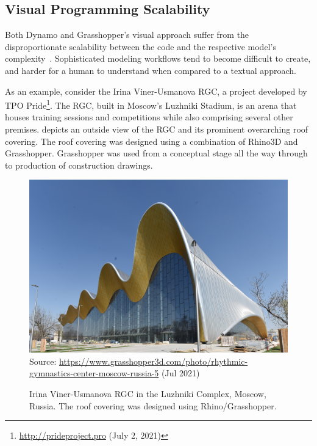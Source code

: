 \subsection{Visual Programming Scalability}%
\label{sec:related.ad.vpl-scalability}

Both Dynamo and Grasshopper's visual approach suffer from the disproportionate
scalability between the code and the respective model's
complexity~\cite{Leitao:2013:PESLGD}.  Sophisticated modeling workflows tend to
become difficult to create, and harder for a human to understand when compared
to a textual approach.

As an example, consider the Irina Viner-Usmanova \ac{RGC}, a project developed
by TPO Pride\footnote{\url{http://prideproject.pro} (July 2, 2021)}.  The
\ac{RGC}, built in Moscow's Luzhniki Stadium, is an arena that houses training
sessions and competitions while also comprising several other premises.
 depicts an outside view of the
\ac{RGC} and its prominent overarching roof covering.  The roof covering was
designed using a combination of Rhino3D and Grasshopper.  Grasshopper was used
from a conceptual stage all the way through to production of construction
drawings.

\begin{figure}[htb]
  \includegraphics[width=\textwidth]{fig/rgc}\\
  {\scriptsize
  Source: \url{https://www.grasshopper3d.com/photo/rhythmic-gymnastics-center-moscow-russia-5}
  (Jul 2021)
  }
  \caption[\acl{RGC} in the Luzhniki Complex]{
    Irina Viner-Usmanova \ac{RGC} in the Luzhniki Complex, Moscow, Russia.  The
    roof covering was designed using Rhino/Grasshopper.}%
  \label{fig:related.ad.vpl-scalability.rgc}
\end{figure}

